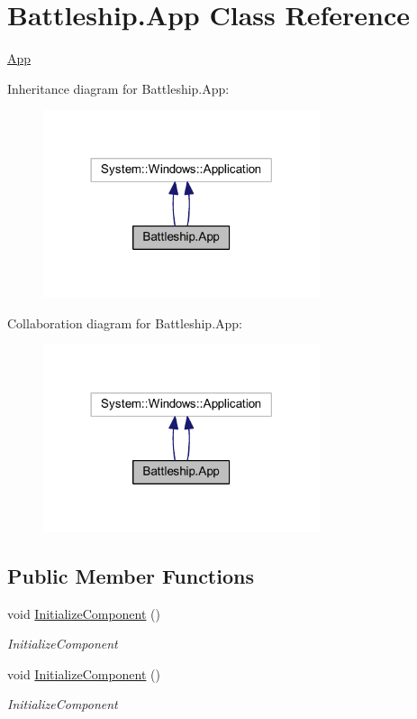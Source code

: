 \hypertarget{class_battleship_1_1_app}{\section{Battleship.\-App Class Reference}
\label{class_battleship_1_1_app}
}


\hyperlink{class_battleship_1_1_app}{App}  




Inheritance diagram for Battleship.\-App\-:\nopagebreak
\begin{figure}[H]
\begin{center}
\leavevmode
\includegraphics[width=230pt]{class_battleship_1_1_app__inherit__graph}
\end{center}
\end{figure}


Collaboration diagram for Battleship.\-App\-:\nopagebreak
\begin{figure}[H]
\begin{center}
\leavevmode
\includegraphics[width=230pt]{class_battleship_1_1_app__coll__graph}
\end{center}
\end{figure}
\subsection*{Public Member Functions}
\begin{DoxyCompactItemize}
\item 
void \hyperlink{class_battleship_1_1_app_a654faa376ccf14b188740da45025b779}{Initialize\-Component} ()
\begin{DoxyCompactList}\small\item\em Initialize\-Component \end{DoxyCompactList}\item 
void \hyperlink{class_battleship_1_1_app_a654faa376ccf14b188740da45025b779}{Initialize\-Component} ()
\begin{DoxyCompactList}\small\item\em Initialize\-Component \end{DoxyCompactList}\end{DoxyCompactItemize}

